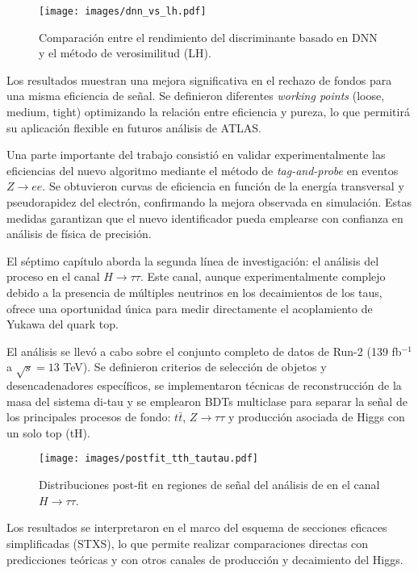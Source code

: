 \begin{figure}[htbp]
  \centering
  \texttt{[image: images/dnn\_vs\_lh.pdf]}
  \caption{Comparación entre el rendimiento del discriminante basado en DNN y el método de verosimilitud (LH).}
  \label{fig:dnn_lh_resumen}
\end{figure}

Los resultados muestran una mejora significativa en el rechazo de fondos para una misma eficiencia de señal. Se
definieron diferentes \textit{working points} (loose, medium, tight) optimizando la relación entre eficiencia y
pureza, lo que permitirá su aplicación flexible en futuros análisis de ATLAS.

Una parte importante del trabajo consistió en validar experimentalmente las eficiencias del nuevo algoritmo mediante
el método de \textit{tag-and-probe} en eventos $Z\to ee$. Se obtuvieron curvas de eficiencia en función de la energía
transversal y pseudorapidez del electrón, confirmando la mejora observada en simulación. Estas medidas garantizan
que el nuevo identificador pueda emplearse con confianza en análisis de física de precisión.

El séptimo capítulo aborda la segunda línea de investigación: el análisis del proceso \ttH en el canal $H\to\tau\tau$.
Este canal, aunque experimentalmente complejo debido a la presencia de múltiples neutrinos en los decaimientos de los
taus, ofrece una oportunidad única para medir directamente el acoplamiento de Yukawa del quark top.

El análisis se llevó a cabo sobre el conjunto completo de datos de Run-2 (139 fb$^{-1}$ a $\sqrt{s}=13$ TeV). Se definieron
criterios de selección de objetos y desencadenadores específicos, se implementaron técnicas de reconstrucción de la masa
del sistema di-tau y se emplearon BDTs multiclase para separar la señal de los principales procesos de fondo: $t\bar{t}$,
$Z\to\tau\tau$ y producción asociada de Higgs con un solo top (tH).

\begin{figure}[htbp]
  \centering
  \texttt{[image: images/postfit\_tth\_tautau.pdf]}
  \caption{Distribuciones post-fit en regiones de señal del análisis de \ttH en el canal $H\to\tau\tau$.}
  \label{fig:tth_resumen}
\end{figure}

Los resultados se interpretaron en el marco del esquema de secciones eficaces simplificadas (STXS), lo que permite
realizar comparaciones directas con predicciones teóricas y con otros canales de producción y decaimiento del Higgs.


